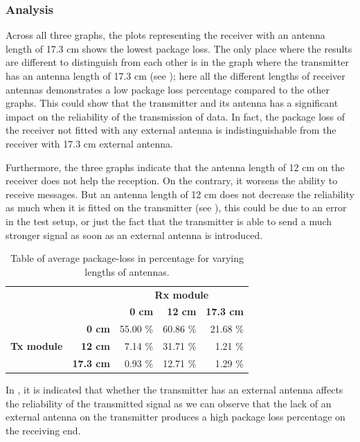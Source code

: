 \subsubsection*{Analysis}
Across all three graphs, the plots representing the receiver with an antenna length of 17.3 cm shows the lowest package loss. 
The only place where the results are different  to distinguish from each other is in the graph where the transmitter has an antenna length of 17.3 cm (see ); here all the different lengths of receiver antennas demonstrates a low package loss percentage compared to the other graphs.
This could show that the transmitter and its antenna has a significant impact on the reliability of the transmission of data.
In fact, the package loss of the receiver not fitted with any external antenna is indistinguishable from the receiver with 17.3 cm external antenna.

Furthermore, the three graphs indicate that the antenna length of 12 cm on the receiver does not help the reception.
On the contrary, it worsens the ability to receive messages.
But an antenna length of 12 cm does not decrease the reliability as much when it is fitted on the transmitter (see ), this could be due to an error in the test setup, or just the fact that the transmitter is able to send a much stronger signal as soon as an external antenna is introduced.

\begin{table}[ht]
\centering
\begin{tabular}{r r r r r}    \toprule
 && \multicolumn{3}{c}{\textbf{Rx module}}\\
 && \textbf{0 cm}    & \textbf{12 cm}    & \textbf{17.3 cm}  \\\midrule
\multirow{3}{*}{\textbf{Tx module}}  &\textbf{0 cm} & 55.00 \%   & 60.86 \% & 21.68 \% \\ 
 &\textbf{12 cm} & 7.14 \% & 31.71 \% & 1.21 \%  \\ 
 &\textbf{17.3 cm} & 0.93 \% & 12.71 \% & 1.29 \%  \\\bottomrule
 \hline
\end{tabular} 
\caption{Table of average package-loss in percentage for varying lengths of antennas.}
\label{tbl:packageloss}
\end{table}

\bigskip
\noindent
In , it is indicated that whether the transmitter has an external antenna affects the reliability of the transmitted signal as we can observe that the lack of an external antenna on the transmitter produces a high package loss percentage on the receiving end.

